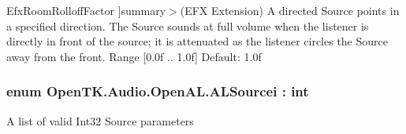 \begin{Desc}
\begin{description}
{\hypertarget{namespace_open_t_k_1_1_audio_1_1_open_a_l_a04d9b7aaf9c70a9e06f053b2d98f5c46a13af8148e8dd7eacfd7877f3549d4e17}{Efx\-Room\-Rolloff\-Factor}\label{namespace_open_t_k_1_1_audio_1_1_open_a_l_a04d9b7aaf9c70a9e06f053b2d98f5c46a13af8148e8dd7eacfd7877f3549d4e17}
}]summary$>$(E\-F\-X Extension) A directed Source points in a specified direction. The Source sounds at full volume when the listener is directly in front of the source; it is attenuated as the listener circles the Source away from the front. Range \mbox{[}0.\-0f .. 1.\-0f\mbox{]} Default\-: 1.\-0f\end{description}
\end{Desc}
\hypertarget{namespace_open_t_k_1_1_audio_1_1_open_a_l_a364b4250b263feec3ed248be5b6a3117}{
\subsubsection[{A\-L\-Sourcei}]{\setlength{\rightskip}{0pt plus 5cm}enum {\bf Open\-T\-K.\-Audio.\-Open\-A\-L.\-A\-L\-Sourcei} \-: int}}\label{namespace_open_t_k_1_1_audio_1_1_open_a_l_a364b4250b263feec3ed248be5b6a3117}


A list of valid Int32 Source parameters

